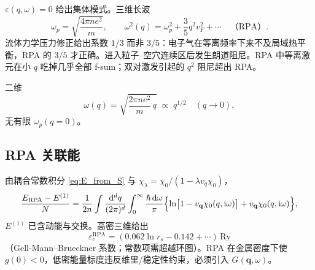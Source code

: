 $\varepsilon(q,\omega)=0$ 给出集体模式。三维长波
\begin{equation}
  \omega_p=\sqrt{\frac{4\pi n e^2}{m}},
  \qquad
  \omega^2(q)
  =\omega_p^2+\frac35 q^2 v_F^2+\cdots
  \quad\text{（RPA）}.
\label{eq:plasmon3D}
\end{equation}
流体力学压力修正给出系数 $1/3$ 而非 $3/5$：电子气在等离频率下来不及局域热平衡，RPA 的 $3/5$ 才正确。进入粒子--空穴连续区后发生朗道阻尼。RPA 中等离激元在小 $q$ 吃掉几乎全部 f-sum；双对激发引起的 $q^2$ 阻尼超出 RPA。

二维
\begin{equation}
  \omega(q)
  =\sqrt{\frac{2\pi n e^2}{m}\,q}
  \;\propto\;q^{1/2}
  \quad(q\to0),
\end{equation}
无有限 $\omega_p(q=0)$。

\subsection{RPA 关联能}

由耦合常数积分 \eqref{eq:E_from_S} 与 $\chi_\lambda=\chi_0/(1-\lambda v_q\chi_0)$，
\begin{equation}
  \frac{E_{\mathrm{RPA}}-E^{(1)}}{N}
  =\frac{1}{2n}
  \int\frac{\mathrm{d}^d q}{(2\pi)^d}
  \int_0^{\infty}\frac{\hbar\,\mathrm{d}\omega}{\pi}
  \Bigl\{
  \ln\bigl[1-v_{\mathbf{q}}\chi_0(q,\mathrm{i}\omega)\bigr]
  +v_{\mathbf{q}}\chi_0(q,\mathrm{i}\omega)
  \Bigr\},
\label{eq:ERPA}
\end{equation}
$E^{(1)}$ 已含动能与交换。高密三维给出
\begin{equation}
  \varepsilon_{\mathrm{c}}^{\mathrm{RPA}}
  =(0.062\ln r_s-0.142+\cdots)\,\mathrm{Ry}
\end{equation}
（Gell-Mann--Brueckner 系数；常数项需超越环图）。RPA 在金属密度下使 $g(0)<0$，低密能量标度违反维里/稳定性约束，必须引入 $G(\mathbf{q},\omega)$。

